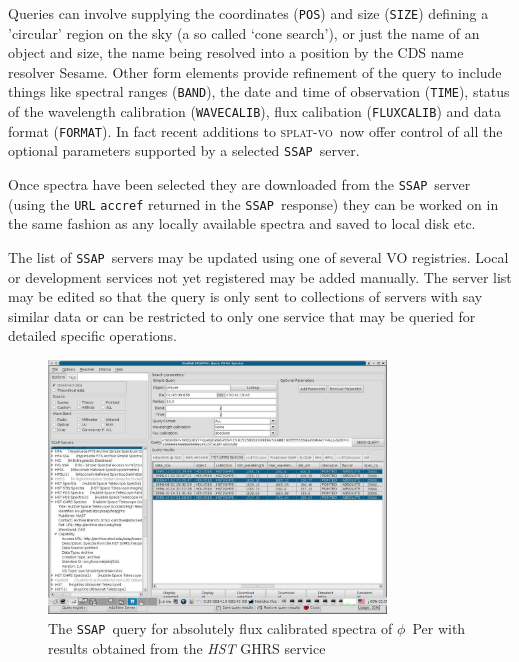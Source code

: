 \documentclass[final,authoryear,5p,times,twocolumn]{elsarticle}
\newcommand{\ssap}{\texttt{SSAP}}
\newcommand{\splatvo}{\textsc{splat-vo}}
\begin{document}
Queries can involve supplying the coordinates (\texttt{POS}) and size
(\texttt{SIZE}) defining a 'circular' region on the sky (a so called `cone
search'), or just the name of an object and size, the name being resolved into
a position by the CDS name resolver Sesame. Other form elements provide
refinement of the query to include things like spectral ranges
(\texttt{BAND}), the date and time of observation (\texttt{TIME}), status of
the wavelength calibration (\texttt{WAVECALIB}), flux calibation
(\texttt{FLUXCALIB}) and data format (\texttt{FORMAT}).  In fact recent
additions to \splatvo\ now offer control of all the optional parameters
supported by a selected \ssap\ server.

Once spectra have been selected they are downloaded from the \ssap\ server
(using the \texttt{URL} \texttt{accref} returned in the \ssap\ response) they
can be worked on in the same fashion as any locally available spectra and
saved to local disk etc.

The list of \ssap\ servers may be updated using one of several VO registries.
Local or development services not yet registered may be added manually. The
server list may be edited so that the query is only sent to collections of
servers with say similar data or can be restricted to only one service that
may be queried for detailed specific operations.

\begin{figure}[Ht]
\begin{center}
\includegraphics[width=0.8\textwidth]{hst_query.pdf}
\caption{The \ssap\ query for absolutely flux calibrated spectra of $\phi$~Per
  with results obtained from the \emph{HST} GHRS service}
\label{fig:hst_query}
\end{center}
\end{figure}
\end{document}
